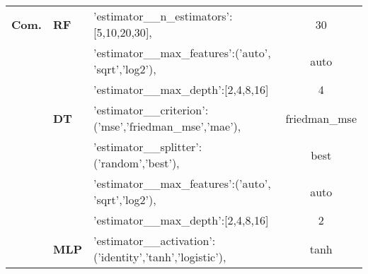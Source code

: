 \begin{table}[]
\begin{adjustwidth}{-2cm}{}
\begin{tabular}{@{}lllc}
\multicolumn{1}{l|}{\textbf{Com.}}   & \multicolumn{1}{l|}{\textbf{RF}}            & \multicolumn{1}{l|}{'estimator\_\_n\_estimators':{[}5,10,20,30{]},}                                                                                         & \multicolumn{1}{c|}{30}            \\ \cline{2-4}
\multicolumn{1}{l|}{\textbf{}}           & \multicolumn{1}{l|}{\textbf{}}              & \multicolumn{1}{l|}{'estimator\_\_max\_features':('auto', 'sqrt','log2'),}                                                                                  & \multicolumn{1}{c|}{auto}          \\ \cline{2-4}
\multicolumn{1}{l|}{\textbf{}}           & \multicolumn{1}{l|}{\textbf{}}              & \multicolumn{1}{l|}{'estimator\_\_max\_depth':{[}2,4,8,16{]}}                                                                                               & \multicolumn{1}{c|}{4}             \\ \cline{2-4}
\multicolumn{1}{l|}{\textbf{}}           & \multicolumn{1}{l|}{\textbf{DT}}            & \multicolumn{1}{l|}{'estimator\_\_criterion':('mse','friedman\_mse','mae'),}                                                                                & \multicolumn{1}{c|}{friedman\_mse} \\ \cline{2-4}
\multicolumn{1}{l|}{\textbf{}}           & \multicolumn{1}{l|}{\textbf{}}              & \multicolumn{1}{l|}{'estimator\_\_splitter':('random','best'),}                                                                                             & \multicolumn{1}{c|}{best}          \\ \cline{2-4}
\multicolumn{1}{l|}{\textbf{}}           & \multicolumn{1}{l|}{\textbf{}}              & \multicolumn{1}{l|}{'estimator\_\_max\_features':('auto', 'sqrt','log2'),}                                                                                  & \multicolumn{1}{c|}{auto}          \\ \cline{2-4}
\multicolumn{1}{l|}{\textbf{}}           & \multicolumn{1}{l|}{\textbf{}}              & \multicolumn{1}{l|}{'estimator\_\_max\_depth':{[}2,4,8,16{]}}                                                                                               & \multicolumn{1}{c|}{2}             \\ \cline{2-4}
\multicolumn{1}{l|}{\textbf{}}           & \multicolumn{1}{l|}{\textbf{MLP}}           & \multicolumn{1}{l|}{'estimator\_\_activation':('identity','tanh','logistic'),}                                                                              & \multicolumn{1}{c|}{tanh}          \\ \cline{2-4}

\end{tabular}
\end{adjustwidth}
\end{table}
